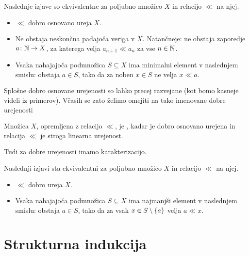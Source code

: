 \begin{izrek}
	Naslednje izjave so ekvivalentne za poljubno množico $X$ in relacijo $\ll$ na njej.
	\begin{itemize}
		\item
			$\ll$ dobro osnovano ureja $X$.
		\item
			Ne obstaja neskončna padajoča veriga v $X$. Natančneje: ne obstaja zaporedje $a\colon \mathbb{N} \to X$, za katerega velja $a_{n+1} \ll a_n$ za vse $n \in \mathbb{N}$.
		\item
			Vsaka nahajajoča podmnožica $S \subseteq X$ ima minimalni element v naslednjem smislu: obstaja $a \in S$, tako da za noben $x \in S$ ne velja $x \ll a$.
	\end{itemize}
\end{izrek}

\begin{dokaz}
\end{dokaz}

Splošne dobro osnovane urejenosti so lahko precej razvejane (kot bomo kasneje videli iz primerov). Včasih se zato želimo omejiti na tako imenovane dobre urejenosti

\begin{definicija}
	Množica $X$, opremljena z relacijo $\ll$, je , kadar je dobro osnovano urejena in relacija $\ll$ je stroga linearna urejenost.
\end{definicija}

Tudi za dobre urejenosti imamo karakterizacijo.

\begin{izrek}
	Naslednji izjavi sta ekvivalentni za poljubno množico $X$ in relacijo $\ll$ na njej.
	\begin{itemize}
		\item
			$\ll$ dobro ureja $X$.
		\item
			Vsaka nahajajoča podmnožica $S \subseteq X$ ima najmanjši element v naslednjem smislu: obstaja $a \in S$, tako da za vsak $x \in S \setminus \set{a}$ velja $a \ll x$.
	\end{itemize}
\end{izrek}

\begin{dokaz}
\end{dokaz}


\section{Strukturna indukcija}



